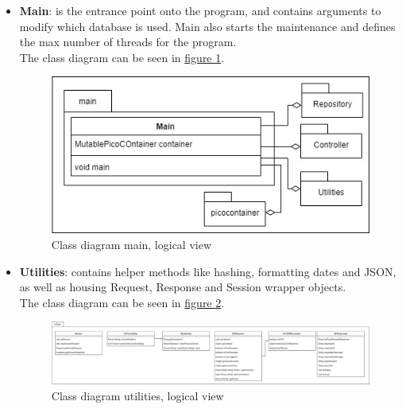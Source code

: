 \begin{itemize}
    \item \textbf{Main}: is the entrance point onto the program, and contains arguments to modify which database is used. Main also starts the maintenance and defines the max number of threads for the program.\\
    The class diagram can be seen in \hyperref[fig:classDiagramMain]{figure \ref{fig:classDiagramMain}}.
    \begin{figure}[H]
        \centering
        \includegraphics[width=1.0\textwidth]{images/class_diagram_main.jpg}
        \caption{Class diagram main, logical view}
        \label{fig:classDiagramMain}
    \end{figure}
    
    \item \textbf{Utilities}: contains helper methods like hashing, formatting dates and JSON, as well as housing Request, Response and Session wrapper objects. \\
    The class diagram can be seen in \hyperref[fig:classDiagramUtilities]{figure \ref{fig:classDiagramUtilities}}.
    \begin{figure}[H]
        \centering
        \includegraphics[width=1.0\textwidth]{images/class_diagram_utilities.jpg}
        \caption{Class diagram utilities, logical view}
        \label{fig:classDiagramUtilities}
    \end{figure}
    

\end{itemize}
